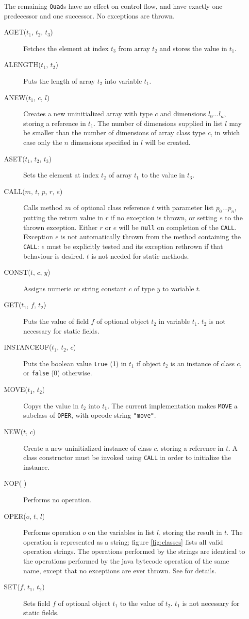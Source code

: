 \documentclass[11pt,notitlepage,twocolumn,twoside]{article}
\begin{document}
%
The remaining \texttt{Quad}s have no effect on control flow, and have
exactly one predecessor and one successor.  No exceptions are thrown.
\begin{description}
\item[AGET($t_1$, $t_2$, $t_3$)] Fetches the element at index $t_3$
from array $t_2$ and stores the value in $t_1$.
%
\item[ALENGTH($t_1$, $t_2$)] Puts the length of array $t_2$ into
variable $t_1$.
%
\item[ANEW($t_1$, $c$, $l$)] Creates a new uninitialized array with
type $c$ and dimensions $l_0 \ldots l_n$, storing a reference in
$t_1$.  The number of dimensions
supplied in list $l$ may be smaller than the number of dimensions of
array class type $c$, in which case only the $n$ dimensions specified
in $l$ will be created.
%
\item[ASET($t_1$, $t_2$, $t_3$)] Sets the element at index $t_2$ of
array $t_1$ to the value in $t_3$.
%
\item[CALL($m$, $t$, $p$, $r$, $e$)] Calls method $m$ of optional class
reference $t$ with parameter list $p_0 \ldots p_n$, 
putting the return value in $r$
if no exception is thrown, or setting $e$ to the thrown exception.
Either $r$ or $e$ will be \texttt{null} on completion of the
\texttt{CALL}.  Exception $e$ is not automatically thrown from the
method containing the \texttt{CALL}: $e$ must be explicitly tested and
its exception rethrown if that behaviour is desired. $t$ is not needed
for static methods.
%
\item[CONST($t$, $c$, $y$)] Assigns numeric or string constant $c$ of 
type $y$ to variable $t$.
%
\item[GET($t_1$, $f$, $t_2$)] Puts the value of field $f$ of optional
object $t_2$ in variable $t_1$. $t_2$ is not necessary for static fields.
%
\item[INSTANCEOF($t_1$, $t_2$, $c$)] Puts the boolean value
\texttt{true} (1) in $t_1$ if object $t_2$ is an instance of class
$c$, or \texttt{false} (0) otherwise.
%
\item[MOVE($t_1$, $t_2$)] Copys the value in $t_2$ into $t_1$.
The current implementation makes \texttt{MOVE} a subclass of
\texttt{OPER}, with opcode string \texttt{"move"}.
%
\item[NEW($t$, $c$)] Create a new uninitialized instance of class $c$,
storing a reference in $t$.  A class constructor must be invoked using
\texttt{CALL} in order to initialize the instance.
%
\item[NOP( )] Performs no operation.
%
\item[OPER($o$, $t$, $l$)] Performs operation $o$ on the variables in
list $l$, storing the result in $t$.  The operation is represented as
a string; figure \ref{fig:classes} lists all valid operation strings.
The operations performed by the strings are identical to the
operations performed by the java bytecode operation of the same name,
except that no exceptions are ever thrown.  See \cite{jvm} for
details.
%
\item[SET($f$, $t_1$, $t_2$)] Sets field $f$ of optional object $t_1$ to the
value of $t_2$.  $t_1$ is not necessary for static fields.
\end{description}
\end{document}
